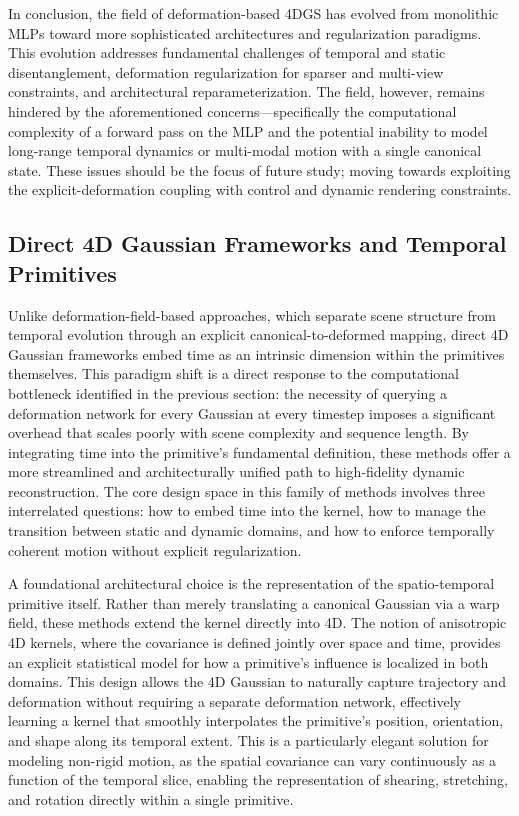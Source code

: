 \documentclass[11pt,a4paper]{article}
\begin{document}
In conclusion, the field of deformation-based 4DGS has evolved from monolithic MLPs toward more sophisticated architectures and regularization paradigms. This evolution addresses fundamental challenges of temporal and static disentanglement, deformation regularization for sparser and multi-view constraints, and architectural reparameterization. The field, however, remains hindered by the aforementioned concerns---specifically the computational complexity of a forward pass on the MLP and the potential inability to model long-range temporal dynamics or multi-modal motion with a single canonical state. These issues should be the focus of future study; moving towards exploiting the explicit-deformation coupling with control and dynamic rendering constraints.


\subsection{Direct 4D Gaussian Frameworks and Temporal Primitives}


Unlike deformation-field-based approaches, which separate scene structure from temporal evolution through an explicit canonical-to-deformed mapping, direct 4D Gaussian frameworks embed time as an intrinsic dimension within the primitives themselves. This paradigm shift is a direct response to the computational bottleneck identified in the previous section: the necessity of querying a deformation network for every Gaussian at every timestep imposes a significant overhead that scales poorly with scene complexity and sequence length. By integrating time into the primitive's fundamental definition, these methods offer a more streamlined and architecturally unified path to high-fidelity dynamic reconstruction. The core design space in this family of methods involves three interrelated questions: how to embed time into the kernel, how to manage the transition between static and dynamic domains, and how to enforce temporally coherent motion without explicit regularization.

A foundational architectural choice is the representation of the spatio-temporal primitive itself. Rather than merely translating a canonical Gaussian via a warp field, these methods extend the kernel directly into 4D. The notion of anisotropic 4D kernels, where the covariance is defined jointly over space and time, provides an explicit statistical model for how a primitive's influence is localized in both domains. This design allows the 4D Gaussian to naturally capture trajectory and deformation without requiring a separate deformation network, effectively learning a kernel that smoothly interpolates the primitive's position, orientation, and shape along its temporal extent. This is a particularly elegant solution for modeling non-rigid motion, as the spatial covariance can vary continuously as a function of the temporal slice, enabling the representation of shearing, stretching, and rotation directly within a single primitive.
\end{document}
